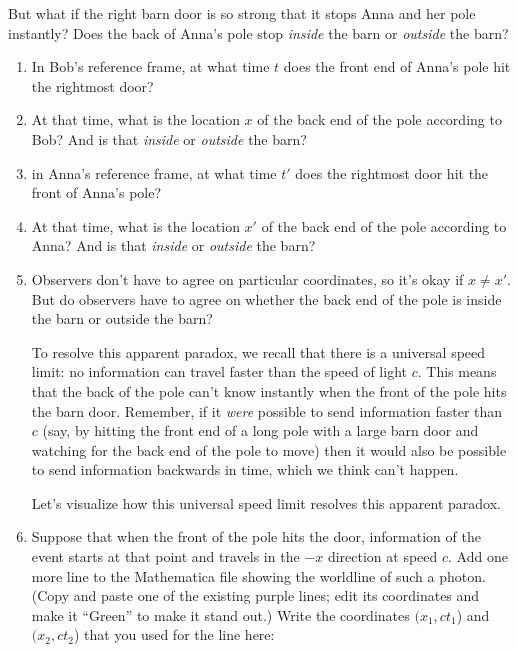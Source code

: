 But what if the right barn door is so strong that it stops Anna and her pole instantly?  Does the back of Anna's pole stop \textit{inside} the barn or \textit{outside} the barn?

\begin{enumerate}[labparts]

\item In Bob's reference frame, at what time $t$ does the front end of Anna's pole hit the rightmost door?
\answerspace{0.6in}

\item At that time, what is the location $x$ of the back end of the pole according to Bob?  And is that \textit{inside} or \textit{outside} the barn?
\answerspace{0.8in}


\item in Anna's reference frame, at what time $t'$ does the rightmost door hit the front of Anna's pole?  
\answerspace{0.6in}

\item At that time, what is the location $x'$ of the back end of the pole according to Anna?  And is that \textit{inside} or \textit{outside} the barn?
\answerspace{0.6in}

\item Observers don't have to agree on particular coordinates, so it's okay if $x \neq x'$.  But do observers have to agree on whether the back end of the pole is inside the barn or outside the barn?
\answerspace{0.6in}

To resolve this apparent paradox, we recall that there is a universal speed limit: no information can travel faster than the speed of light $c$.  This means that the back of the pole can't know instantly when the front of the pole hits the barn door.  Remember, if it \textit{were} possible to send information faster than $c$ (say, by hitting the front end of a long pole with a large barn door and watching for the back end of the pole to move) then it would also be possible to send information backwards in time, which we think can't happen.
  
Let's visualize how this universal speed limit resolves this apparent paradox.

\item Suppose that when the front of the pole hits the door, information of the event starts at that point and travels in the $-x$ direction at speed $c$.  Add one more line to the Mathematica file showing the worldline of such a photon.  (Copy and paste one of the existing purple lines; edit its coordinates and make it ``Green'' to make it stand out.)  Write the coordinates $(x_1, ct_1$) and $(x_2, ct_2$) that you used for the line here:
\answerspace{0.6in}


\end{enumerate}
